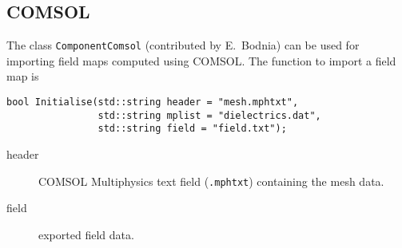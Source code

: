 \subsection{COMSOL}

The class \texttt{ComponentComsol} (contributed by E.~Bodnia) can be used for 
importing field maps computed using COMSOL.
The function to import a field map is 
\begin{lstlisting}
bool Initialise(std::string header = "mesh.mphtxt",
                std::string mplist = "dielectrics.dat",
                std::string field = "field.txt");
\end{lstlisting}
\begin{description}
  \item[header] COMSOL Multiphysics text field (\texttt{.mphtxt}) containing the mesh data.
  \item[field] exported field data. 
\end{description}

